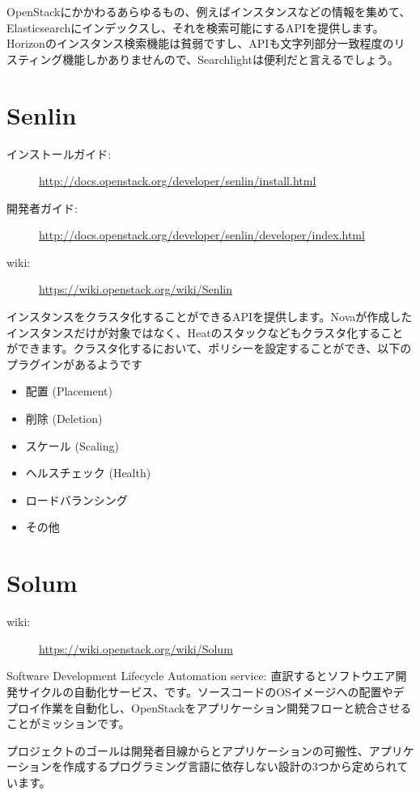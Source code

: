 \documentclass[10pt,b5paper,tombo,openany]{jsbook}
\begin{document}
OpenStackにかかわるあらゆるもの、例えばインスタンスなどの情報を集めて、Elasticsearchにインデックスし、それを検索可能にするAPIを提供します。Horizonのインスタンス検索機能は貧弱ですし、APIも文字列部分一致程度のリスティング機能しかありませんので、Searchlightは便利だと言えるでしょう。

\section{Senlin}
\begin{description}
	\item[インストールガイド:] \url{http://docs.openstack.org/developer/senlin/install.html}
	\item[開発者ガイド:] \url{http://docs.openstack.org/developer/senlin/developer/index.html}
	\item[wiki:] \url{https://wiki.openstack.org/wiki/Senlin}
\end{description}
インスタンスをクラスタ化することができるAPIを提供します。Novaが作成したインスタンスだけが対象ではなく、Heatのスタックなどもクラスタ化することができます。クラスタ化するにおいて、ポリシーを設定することができ、以下のプラグインがあるようです

\begin{itemize}
	\item 配置 (Placement)
	\item 削除 (Deletion)
	\item スケール (Scaling)
	\item ヘルスチェック (Health)
	\item ロードバランシング
	\item その他
\end{itemize}

\section{Solum}
\begin{description}
	\item[wiki:] \url{https://wiki.openstack.org/wiki/Solum}
\end{description}
Software Development Lifecycle Automation service: 直訳するとソフトウエア開発サイクルの自動化サービス、です。ソースコードのOSイメージへの配置やデプロイ作業を自動化し、OpenStackをアプリケーション開発フローと統合させることがミッションです。

プロジェクトのゴールは開発者目線からとアプリケーションの可搬性、アプリケーションを作成するプログラミング言語に依存しない設計の3つから定められています。
\end{document}

